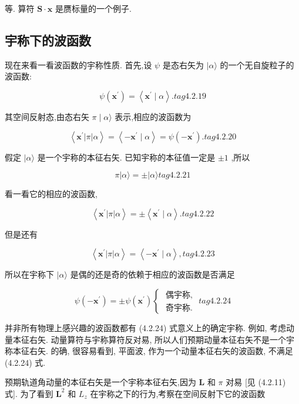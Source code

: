 等. 算符 $\mathbf{S} \cdot \mathbf{x}$ 是赝标量的一个例子.

\subsection{宇称下的波函数}

现在来看一看波函数的宇称性质. 首先,设 $\psi$ 是态右矢为 $|\alpha \rangle$ 的一个无自旋粒子的波函数:

$$
\psi \left( {\mathbf{x}}^{\prime }\right) = \left\langle {{\mathbf{x}}^{\prime } \mid \alpha }\right\rangle . tag{4.2.19}
$$

其空间反射态,由态右矢 $\pi \mid \alpha \rangle$ 表示,相应的波函数为

$$
\left\langle {{\mathbf{x}}^{\prime }\left| \pi \right| \alpha }\right\rangle = \left\langle {-{\mathbf{x}}^{\prime } \mid \alpha }\right\rangle = \psi \left( {-{\mathbf{x}}^{\prime }}\right) . tag{4.2.20}
$$

假定 $|\alpha \rangle$ 是一个宇称的本征右矢. 已知宇称的本征值一定是 $\pm 1$ ,所以

$$
\pi \left| {\alpha \rangle = \pm }\right| \alpha \rangle tag{4.2.21}
$$

看一看它的相应的波函数,

$$
\left\langle {{\mathbf{x}}^{\prime }\left| \pi \right| \alpha }\right\rangle = \pm \left\langle {{\mathbf{x}}^{\prime } \mid \alpha }\right\rangle . tag{4.2.22}
$$

但是还有

$$
\left\langle {{\mathbf{x}}^{\prime }\left| \pi \right| \alpha }\right\rangle = \left\langle {-{\mathbf{x}}^{\prime } \mid \alpha }\right\rangle , tag{4.2.23}
$$

所以在宇称下 $|\alpha \rangle$ 是偶的还是奇的依赖于相应的波函数是否满足

$$
\psi \left( {-{\mathbf{x}}^{\prime }}\right) = \pm \psi \left( {\mathbf{x}}^{\prime }\right) \left\{ \begin{array}{l} \text{ 偶宇称,} \\ \text{ 奇宇称. } \end{array}\right. tag{4.2.24}
$$

并非所有物理上感兴趣的波函数都有 (4.2.24) 式意义上的确定宇称. 例如, 考虑动量本征右矢. 动量算符与宇称算符反对易, 所以人们预期动量本征右矢不是一个宇称本征右矢. 的确, 很容易看到, 平面波, 作为一个动量本征右矢的波函数, 不满足 (4.2.24) 式.

预期轨道角动量的本征右矢是一个宇称本征右矢,因为 $\mathbf{L}$ 和 $\pi$ 对易 [见 (4.2.11) 式]. 为了看到 ${\mathbf{L}}^{2}$ 和 ${L}_{z}$ 在宇称之下的行为,考察在空间反射下它的波函数

